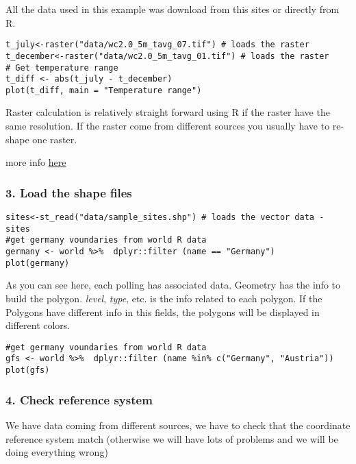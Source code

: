 \documentclass[
]{book}
\theoremstyle{definition}
\theoremstyle{definition}
\theoremstyle{definition}
\theoremstyle{definition}
\theoremstyle{remark}
\begin{document}
All the data used in this example was download from this sites or directly from R.

\begin{verbatim}
t_july<-raster("data/wc2.0_5m_tavg_07.tif") # loads the raster
t_december<-raster("data/wc2.0_5m_tavg_01.tif") # loads the raster
# Get temperature range
t_diff <- abs(t_july - t_december)
plot(t_diff, main = "Temperature range")
\end{verbatim}

Raster calculation is relatively straight forward using R if the raster have the same resolution. If the raster come from different sources you usually have to re-shape one raster.

more info \href{https://rspatial.org/spatial/4-rasterdata.html}{here}

\hypertarget{load-the-shape-files}{%
\subsubsection{3. Load the shape files}\label{load-the-shape-files}}

\begin{verbatim}
sites<-st_read("data/sample_sites.shp") # loads the vector data - sites
#get germany voundaries from world R data
germany <- world %>%  dplyr::filter (name == "Germany")
plot(germany)
\end{verbatim}

As you can see here, each polling has associated data. Geometry has the info to build the polygon. \emph{level}, \emph{type}, etc. is the info related to each polygon. If the Polygons have different info in this fields, the polygons will be displayed in different colors.

\begin{verbatim}
#get germany voundaries from world R data
gfs <- world %>%  dplyr::filter (name %in% c("Germany", "Austria"))
plot(gfs)
\end{verbatim}

\hypertarget{check-reference-system}{%
\subsubsection{4. Check reference system}\label{check-reference-system}}

We have data coming from different sources, we have to check that the coordinate reference system match (otherwise we will have lots of problems and we will be doing everything wrong)
\end{document}
